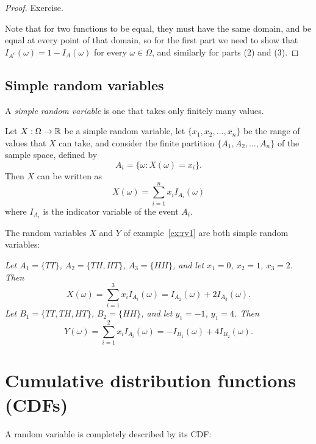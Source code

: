 \begin{proof}
\hideoff
Exercise. 
\par
Note that for two functions to be equal, they must have the same domain, and be equal at every point of that domain, so for the first part we need to show that $I_{A^c}(\omega) = 1-I_A(\omega)$ for every $\omega\in\Omega$, and similarly for parts (2) and (3).
\hideon
\end{proof}

\newpage

\subsection{Simple random variables}
\begin{definition}
A \emph{simple random variable} is one that takes only finitely many values.
\end{definition}

Let $X:\Omega\to\mathbb{R}$ be a simple random variable, let $\{x_1,x_2,\ldots,x_n\}$ be the range of values that $X$ can take, and consider the finite partition $\{A_1,A_2,\ldots,A_n\}$ of the sample space, defined by
\[
A_i = \{\omega:X(\omega) = x_i\}.
\]
Then $X$ can be written as
\[
X(\omega)= \sum_{i=1}^n x_i I_{A_i}(\omega)
\]
where $I_{A_i}$ is the indicator variable of the event $A_i$.


\begin{example}
The random variables $X$ and $Y$ of example~\ref{ex:rv1} are both simple random variables:
\end{example}
\begin{hidebox}
\ben
\it Let $A_1=\{TT\}$, $A_2=\{TH,HT\}$, $A_3=\{HH\}$, and let $x_1=0$, $x_2=1$, $x_3=2$. Then
\[
X(\omega) = \sum_{i=1}^3 x_i I_{A_i}(\omega) = I_{A_2}(\omega) + 2I_{A_3}(\omega).
\]
\it Let $B_1=\{TT, TH, HT\}$, $B_2 = \{HH\}$, and let $y_1=-1$, $y_1=4$. Then 
\[
Y(\omega) = \sum_{i=1}^2 x_i I_{A_i}(\omega) = -I_{B_1}(\omega) + 4I_{B_2}(\omega).
\]
\een
\end{hidebox}

\section{Cumulative distribution functions (CDFs)}
A random variable is completely described by its CDF:

